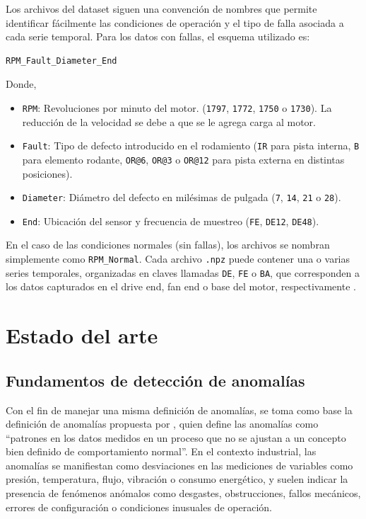 \documentclass[11pt,a4paper,spanish]{book}
\numberwithin{equation}{chapter}
\numberwithin{figure}{chapter}
\begin{document}
Los archivos del dataset siguen una convención de nombres que permite identificar fácilmente las condiciones de operación y el tipo de falla asociada a cada serie temporal. Para los datos con fallas, el esquema utilizado es:


\begin{verbatim}
RPM_Fault_Diameter_End
\end{verbatim}


Donde, 

\begin{itemize}
	\item \texttt{RPM}: Revoluciones por minuto del motor. (\texttt{1797}, \texttt{1772}, \texttt{1750} o \texttt{1730}). La reducción de la velocidad se debe a que se le agrega carga al motor.
	\item \texttt{Fault}: Tipo de defecto introducido en el rodamiento (\texttt{IR} para pista interna, \texttt{B} para elemento rodante, \texttt{OR@6}, \texttt{OR@3} o \texttt{OR@12} para pista externa en distintas posiciones).
	\item \texttt{Diameter}: Diámetro del defecto en milésimas de pulgada (\texttt{7}, \texttt{14}, \texttt{21} o \texttt{28}).
	\item \texttt{End}: Ubicación del sensor y frecuencia de muestreo (\texttt{FE}, \texttt{DE12}, \texttt{DE48}).
\end{itemize}


En el caso de las condiciones normales (sin fallas), los archivos se nombran simplemente como \texttt{RPM\_Normal}. 
Cada archivo \texttt{.npz} puede contener una o varias series temporales, organizadas en claves llamadas \texttt{DE}, \texttt{FE} o \texttt{BA}, que corresponden a los datos capturados en el drive end, fan end o base del motor, respectivamente \cite{rigas2024marine}.


\section{Estado del arte}

\subsection{Fundamentos de detección de anomalías}

Con el fin de manejar una misma definición de anomalías, se toma como base la 
definición de anomalías propuesta por \cite{leon2012anomalias}, quien define las 
anomalías como “patrones en los datos medidos en un proceso que no se ajustan a un 
concepto bien definido de comportamiento normal”. 
En el contexto industrial, las anomalías se manifiestan como desviaciones en las 
mediciones de variables como presión, temperatura, flujo, vibración o consumo 
energético, y suelen indicar la presencia de fenómenos anómalos como desgastes, 
obstrucciones, fallos mecánicos, errores de configuración o condiciones inusuales 
de operación.
\end{document}
